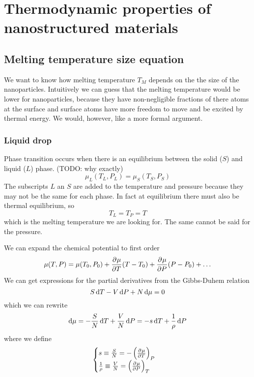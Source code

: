 \chapter{Thermodynamic properties of nanostructured materials}
\section{Melting temperature size equation}
We want to know how melting temperature $T_M$ depends on the the size of the nanoparticles. Intuitively we can guess that the melting temperature would be lower for nanoparticles, because they have non-negligible fractions of there atoms at the surface and surface atoms  have more freedom to move and be excited by thermal energy. We would, however, like a more formal argument.


\subsection{Liquid drop}
Phase transition occurs when there is an equilibrium between the solid ($S$) and liquid ($L$) phase. (TODO: why exactly)
\[ \mu_L(T_L,P_L) = \mu_S(T_S,P_S) \]
The subscripts $L$ an $S$ are added to the temperature and pressure because they may not be the same for each phase. In fact at equilibrium there must also be thermal equilibrium, so
\[ T_L = T_P = T \]
which is the melting temperature we are looking for. The same cannot be said for the pressure.

We can expand the chemical potential to first order
\[ \mu(T,P) = \mu(T_0,P_0) +  \frac{\partial{^{}}\mu}{\partial{{T}^{}}} (T-T_0) +  \frac{\partial{^{}}\mu}{\partial{{P}^{}}} (P-P_0) + \ldots \]
We can get expressions for the partial derivatives from the Gibbs-Duhem relation
\[ S \operatorname{d \!}{T} - V \operatorname{d \!}{P} + N \operatorname{d \!}{\mu} = 0 \]
which we can rewrite
\[ \operatorname{d \!}{\mu} = - \frac{S}{N}\operatorname{d \!}{T} + \frac{V}{N}\operatorname{d \!}{P} = -s \operatorname{d \!}{T} + \frac{1}{\rho}\operatorname{d \!}{P} \]
where we define
\[ \begin{cases}
s \equiv \frac{S}{N} = - \left( \frac{\partial{^{}}\mu}{\partial{{T}^{}}} \right)_P \\
\frac{1}{\rho} \equiv \frac{V}{N} = \left( \frac{\partial{^{}}\mu}{\partial{{P}^{}}} \right)_T
\end{cases} \]

